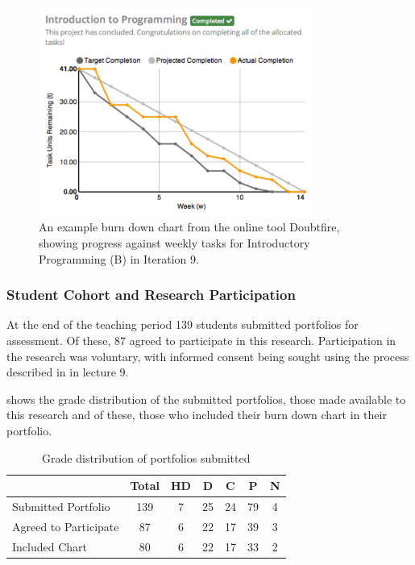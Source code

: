 \begin{figure}[thbp]
  \centering
  \includegraphics[width=0.8\textwidth]{ExampleChart}
  \caption{An example burn down chart from the online tool Doubtfire, showing progress against weekly tasks for Introductory Programming (B) in Iteration 9.}
  \label{fig:progress_example_chart} 
\end{figure}


\subsubsection{Student Cohort and Research Participation} %
\label{sub:progress_student_cohort}

At the end of the teaching period 139 students submitted portfolios for assessment. Of these, 87 agreed to participate in this research. Participation in the research was voluntary, with informed consent being sought using the process described in  in lecture 9.

 shows the grade distribution of the submitted portfolios, those made available to this research and of these, those who included their burn down chart in their portfolio.

\begin{table}[hbp]
  \footnotesize
  \renewcommand{\arraystretch}{1.3}
  \caption{Grade distribution of portfolios submitted}
  \label{tbl:progress_student_numbers}
  \centering
  \begin{tabular}{l|c|c|c|c|c|c}
        ~                     & Total & HD & D & C & P & N  \\ \hline
        Submitted Portfolio   & 139    & 7                & 25          & 24     & 79   & 4     \\ %
        Agreed to Participate & 87    & 6                & 22          & 17     & 39   & 3     \\ %
        Included Chart & 80 & 6 & 22 & 17 & 33 & 2 \\
  \end{tabular}
\end{table}

